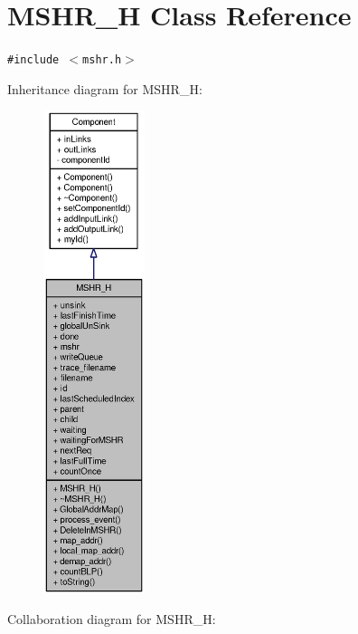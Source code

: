 \section{MSHR\_\-H Class Reference}
\label{classMSHR__H}
{\tt \#include $<$mshr.h$>$}

Inheritance diagram for MSHR\_\-H:\nopagebreak
\begin{figure}[H]
\begin{center}
\leavevmode
\includegraphics[height=400pt]{classMSHR__H__inherit__graph}
\end{center}
\end{figure}
Collaboration diagram for MSHR\_\-H:\nopagebreak

